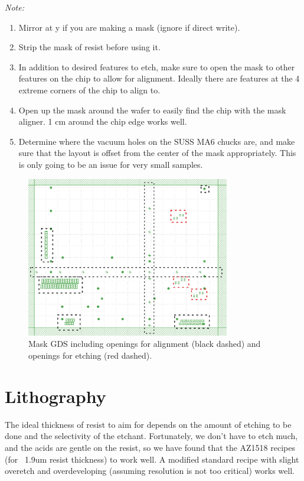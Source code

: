 \textit{Note:}
\begin{enumerate}
    \item Mirror at y if you are making a mask (ignore if direct write).
    \item Strip the mask of resist before using it.
    \item In addition to desired features to etch, make sure to open the mask to other features on the chip to allow for alignment. Ideally there are features at the 4 extreme corners of the chip to align to. 
    \item Open up the mask around the wafer to easily find the chip with the mask aligner. 1 cm around the chip edge works well. 
    \item Determine where the vacuum holes on the SUSS MA6 chucks are, and make sure that the layout is offset from the center of the mask appropriately. This is only going to be an issue for very small samples. 
\end{enumerate}

\begin{figure}[!htbp]
\centering
\includegraphics[width=3.5in]{./Figures/AppendixB/mask.pdf}
\caption[Mask for PIC aluminum etching.]{Mask GDS including openings for alignment (black dashed) and openings for etching (red dashed).}
\label{FigAppB2}
\end{figure}

\section{Lithography}
\qquad The ideal thickness of resist to aim for depends on the amount of etching to be done and the selectivity of the etchant. Fortunately, we don’t have to etch much, and the acids are gentle on the resist, so we have found that the AZ1518 recipes (for ~1.9um resist thickness) to work well. A modified standard recipe with slight overetch and overdeveloping (assuming resolution is not too critical) works well.

